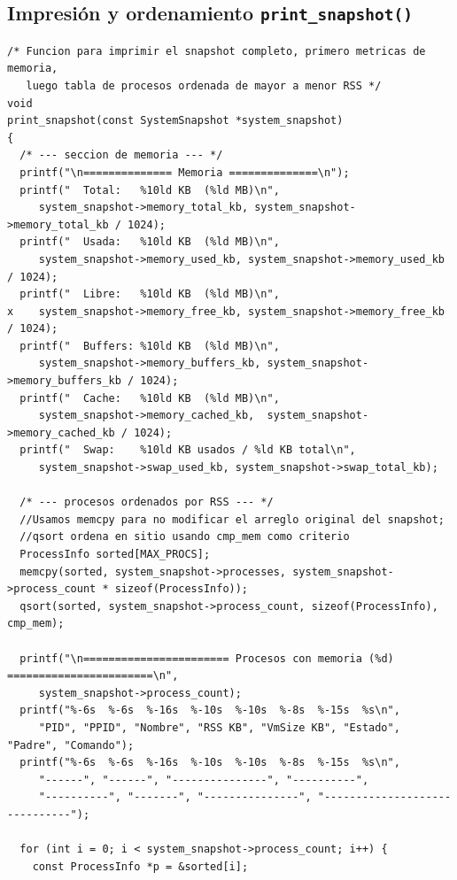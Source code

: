 \documentclass[12pt,letterpaper]{article}
\begin{document}
\subsection*{Impresión y ordenamiento \texttt{print\_snapshot()}}

\begin{lstlisting}[style=modernc, caption={\texttt{monitor.c} print\_snapshot() (líneas 124--180)}]
/* Funcion para imprimir el snapshot completo, primero metricas de memoria,
   luego tabla de procesos ordenada de mayor a menor RSS */
void
print_snapshot(const SystemSnapshot *system_snapshot)
{
  /* --- seccion de memoria --- */
  printf("\n============== Memoria ==============\n");
  printf("  Total:   %10ld KB  (%ld MB)\n",
	 system_snapshot->memory_total_kb, system_snapshot->memory_total_kb / 1024);
  printf("  Usada:   %10ld KB  (%ld MB)\n",
	 system_snapshot->memory_used_kb, system_snapshot->memory_used_kb / 1024);
  printf("  Libre:   %10ld KB  (%ld MB)\n",
x	 system_snapshot->memory_free_kb, system_snapshot->memory_free_kb / 1024);
  printf("  Buffers: %10ld KB  (%ld MB)\n",
	 system_snapshot->memory_buffers_kb, system_snapshot->memory_buffers_kb / 1024);
  printf("  Cache:   %10ld KB  (%ld MB)\n",
	 system_snapshot->memory_cached_kb,  system_snapshot->memory_cached_kb / 1024);
  printf("  Swap:    %10ld KB usados / %ld KB total\n",
	 system_snapshot->swap_used_kb, system_snapshot->swap_total_kb);

  /* --- procesos ordenados por RSS --- */
  //Usamos memcpy para no modificar el arreglo original del snapshot;
  //qsort ordena en sitio usando cmp_mem como criterio
  ProcessInfo sorted[MAX_PROCS];
  memcpy(sorted, system_snapshot->processes, system_snapshot->process_count * sizeof(ProcessInfo));
  qsort(sorted, system_snapshot->process_count, sizeof(ProcessInfo), cmp_mem);

  printf("\n======================= Procesos con memoria (%d) =======================\n",
	 system_snapshot->process_count);
  printf("%-6s  %-6s  %-16s  %-10s  %-10s  %-8s  %-15s  %s\n",
	 "PID", "PPID", "Nombre", "RSS KB", "VmSize KB", "Estado", "Padre", "Comando");
  printf("%-6s  %-6s  %-16s  %-10s  %-10s  %-8s  %-15s  %s\n",
	 "------", "------", "---------------", "----------",
	 "----------", "-------", "---------------", "------------------------------");

  for (int i = 0; i < system_snapshot->process_count; i++) {
    const ProcessInfo *p = &sorted[i];


\end{lstlisting}
\end{document}
